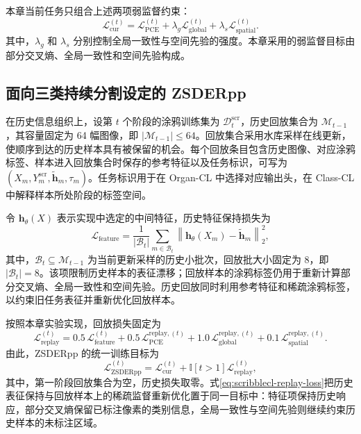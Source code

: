 本章当前任务只组合上述两项弱监督约束：
\begin{equation}
\mathcal{L}_{\mathrm{cur}}^{(t)}
=
\mathcal{L}_{\mathrm{PCE}}^{(t)}
+
\lambda_{g}\mathcal{L}_{\mathrm{global}}^{(t)}
+
\lambda_{s}\mathcal{L}_{\mathrm{spatial}}^{(t)}.
\label{eq:scribblecl-current-loss}
\end{equation}
其中，$\lambda_g$ 和 $\lambda_s$ 分别控制全局一致性与空间先验的强度。本章采用的弱监督目标由部分交叉熵、全局一致性和空间先验构成\cite{zhang2026zscribbleseg}。

\subsection{面向三类持续分割设定的 ZSDERpp}
\label{subsec:scribblecl-methods}

在历史信息组织上，设第 $t$ 个阶段的涂鸦训练集为 $\mathcal{D}^{\mathrm{scr}}_t$，历史回放集合为 $\mathcal{M}_{t-1}$，其容量固定为 64 幅图像，即 $|\mathcal{M}_{t-1}|\leq 64$。回放集合采用水库采样在线更新，使顺序到达的历史样本具有被保留的机会。每个回放条目包含历史图像、对应涂鸦标签、样本进入回放集合时保存的参考特征以及任务标识，可写为
$(X_m,Y_m^{\mathrm{scr}},\widetilde{\mathbf h}_m,\tau_m)$。任务标识用于在 Organ-CL 中选择对应输出头，在 Class-CL 中解释样本所处阶段的标签空间。

令 $\mathbf h_{\theta}(X)$ 表示实现中选定的中间特征，历史特征保持损失为
\begin{equation}
\mathcal{L}_{\mathrm{feature}}
=
\frac{1}{|\mathcal{B}_t|}
\sum_{m\in\mathcal{B}_t}
\left\|
\mathbf h_{\theta}(X_m)-\widetilde{\mathbf h}_m
\right\|_2^2,
\label{eq:scribblecl-feature-loss}
\end{equation}
其中，$\mathcal{B}_t\subseteq\mathcal{M}_{t-1}$ 为当前更新采样的历史小批次，回放批大小固定为 8，即 $|\mathcal{B}_t|=8$。该项限制历史样本的表征漂移；回放样本的涂鸦标签仍用于重新计算部分交叉熵、全局一致性和空间先验。历史回放同时利用参考特征和稀疏涂鸦标签，以约束旧任务表征并重新优化回放样本。

按照本章实验实现，回放损失固定为
\begin{equation}
\mathcal{L}_{\mathrm{replay}}^{(t)}
=
0.5\,\mathcal{L}_{\mathrm{feature}}^{(t)}
+
0.5\,\mathcal{L}_{\mathrm{PCE}}^{\mathrm{replay},(t)}
+
1.0\,\mathcal{L}_{\mathrm{global}}^{\mathrm{replay},(t)}
+
0.1\,\mathcal{L}_{\mathrm{spatial}}^{\mathrm{replay},(t)}.
\label{eq:scribblecl-replay-loss}
\end{equation}
由此，ZSDERpp 的统一训练目标为
\begin{equation}
\mathcal{L}_{\mathrm{ZSDERpp}}^{(t)}
=
\mathcal{L}_{\mathrm{cur}}^{(t)}
+
\mathbb{I}[t>1]\mathcal{L}_{\mathrm{replay}}^{(t)},
\label{eq:scribblecl-zsderpp-total}
\end{equation}
其中，第一阶段回放集合为空，历史损失取零。式\eqref{eq:scribblecl-replay-loss}把历史表征保持与回放样本上的稀疏监督重新优化置于同一目标中：特征项保持历史响应，部分交叉熵保留已标注像素的类别信息，全局一致性与空间先验则继续约束历史样本的未标注区域。

